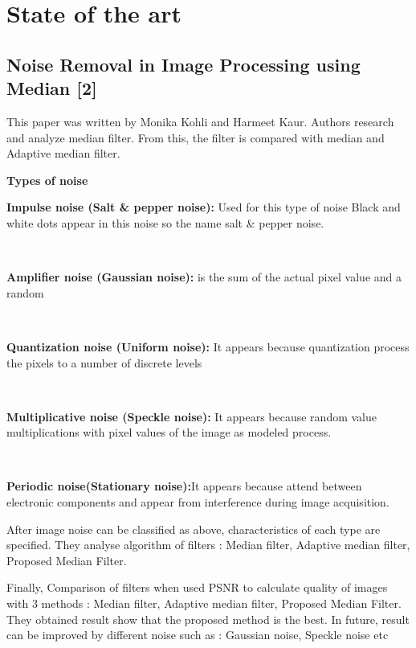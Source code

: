 \chapter{State of the art}
\section{Noise Removal in Image Processing using Median [2]}

This paper was written by Monika Kohli and Harmeet Kaur. Authors research and analyze median filter. From this, the filter is compared with median and Adaptive median filter. 
\vspace{1cm}

\textbf{Types of noise}
\vspace{0.5cm}

\textbf{Impulse noise (Salt \& pepper noise):}  Used for this type of noise  Black and white dots appear in this noise so the name salt \& pepper noise. 

\

\textbf{Amplifier noise (Gaussian noise):} 
is the sum of the actual pixel value and a random 

\

\textbf{Quantization noise (Uniform noise):} It appears because quantization process the pixels to a number of discrete levels

\

\textbf{Multiplicative noise (Speckle noise):} It appears because random value multiplications with pixel values of the image as modeled process.



\

\textbf{Periodic noise(Stationary noise):}It appears because attend between electronic components and appear from interference during image acquisition.
\vspace{0.5cm}

After image noise can be classified as above, characteristics of each type are specified. They analyse algorithm of filters : Median filter, Adaptive median filter, Proposed Median Filter.  
\vspace{1cm}


Finally, Comparison of filters when used PSNR to calculate quality of images with 3 methods : Median filter, Adaptive median filter, Proposed Median Filter. They obtained result show that the proposed method is the best. In future, result can be improved by different noise such as : Gaussian noise, Speckle noise etc
\vspace{2cm}

